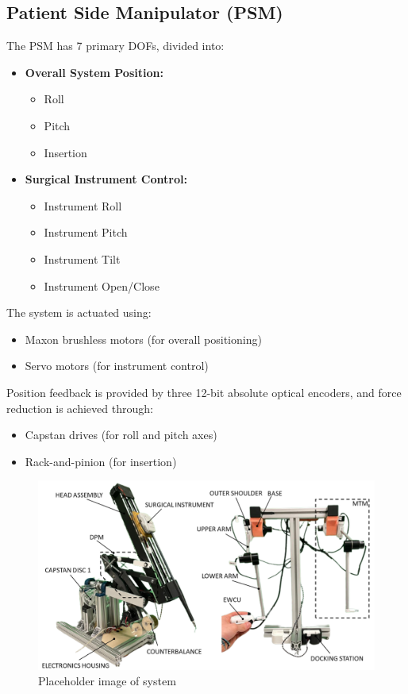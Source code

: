 \subsection{Patient Side Manipulator (PSM)}
The PSM has 7 primary DOFs, divided into:

\begin{itemize}
    \item \textbf{Overall System Position:}
        \begin{itemize}
            \item Roll
            \item Pitch
            \item Insertion
        \end{itemize}
    \item \textbf{Surgical Instrument Control:}
        \begin{itemize}
            \item Instrument Roll
            \item Instrument Pitch
            \item Instrument Tilt
            \item Instrument Open/Close
        \end{itemize}
\end{itemize}

The system is actuated using:
\begin{itemize}
    \item Maxon brushless motors (for overall positioning)
    \item Servo motors (for instrument control)
\end{itemize}

Position feedback is provided by three 12-bit absolute optical encoders, and force reduction is achieved through:
\begin{itemize}
    \item Capstan drives (for roll and pitch axes)
    \item Rack-and-pinion (for insertion)
\end{itemize}

\begin{figure}[h]
    \centering
    \includegraphics[width=0.75\linewidth]{figures/design/system_overview.png}
    \caption{Placeholder image of system}
    \label{fig:enter-label}
\end{figure}



